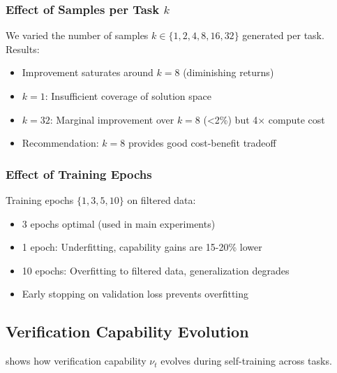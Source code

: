 \documentclass{article}
\theoremstyle{definition}
\theoremstyle{remark}
\begin{document}
\subsubsection{Effect of Samples per Task \(k\)}

We varied the number of samples \(k \in \{1, 2, 4, 8, 16, 32\}\) generated per task. Results:
\begin{itemize}
\item Improvement saturates around \(k = 8\) (diminishing returns)
\item \(k = 1\): Insufficient coverage of solution space
\item \(k = 32\): Marginal improvement over \(k = 8\) (\textless 2\%) but 4× compute cost
\item Recommendation: \(k = 8\) provides good cost-benefit tradeoff
\end{itemize}

\subsubsection{Effect of Training Epochs}

Training epochs \(\{1, 3, 5, 10\}\) on filtered data:
\begin{itemize}
\item 3 epochs optimal (used in main experiments)
\item 1 epoch: Underfitting, capability gains are 15-20\% lower
\item 10 epochs: Overfitting to filtered data, generalization degrades
\item Early stopping on validation loss prevents overfitting
\end{itemize}

\subsection{Verification Capability Evolution}

 shows how verification capability \(\nu_t\) evolves during self-training across tasks.
\end{document}
